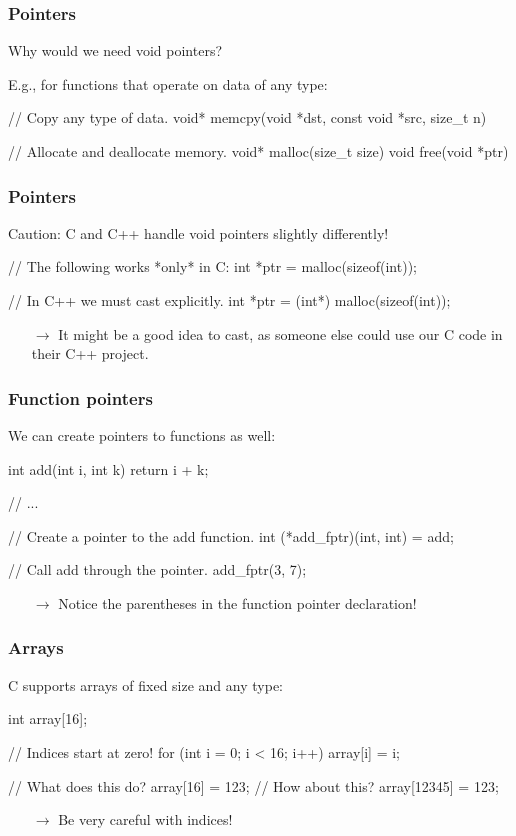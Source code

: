 \documentclass[12pt,t]{beamer}
\newcommand{\conclude}[1]{%
  \begin{itemize}
    \item[$\rightarrow$]#1
  \end{itemize}
}
\begin{document}
  \begin{frame}[fragile]
    \frametitle{Pointers}

    Why would we need void pointers?\pause

    E.g., for functions that operate on data of any type:
    \begin{code}
// Copy any type of data.
void* memcpy(void *dst, const void *src, size_t n)

// Allocate and deallocate memory.
void* malloc(size_t size)
void free(void *ptr)
    \end{code}
  \end{frame}

  \begin{frame}[fragile]
    \frametitle{Pointers}

    Caution: C and C++ handle void pointers slightly differently!
    \begin{code}
// The following works *only* in C:
int *ptr = malloc(sizeof(int));

// In C++ we must cast explicitly.
int *ptr = (int*) malloc(sizeof(int));
    \end{code}
    \conclude{It might be a good idea to cast, as someone else could use our C code in their C++ project.}
  \end{frame}

  \begin{frame}[fragile]
    \frametitle{Function pointers}

    We can create pointers to functions as well:
    \begin{code}
int add(int i, int k) { return i + k; }

// ...

// Create a pointer to the add function.
int (*add_fptr)(int, int) = add;

// Call add through the pointer.
add_fptr(3, 7);
    \end{code}

    \conclude{Notice the parentheses in the function pointer declaration!}
  \end{frame}

  \begin{frame}[fragile]
    \frametitle{Arrays}

    C supports arrays of fixed size and any type:
    \begin{code}
int array[16];

// Indices start at zero!
for (int i = 0; i < 16; i++) {
  array[i] = i;
}

// What does this do?
array[16] = 123;
// How about this?
array[12345] = 123;
    \end{code}

    \conclude{Be very careful with indices!}
  \end{frame}
\end{document}
